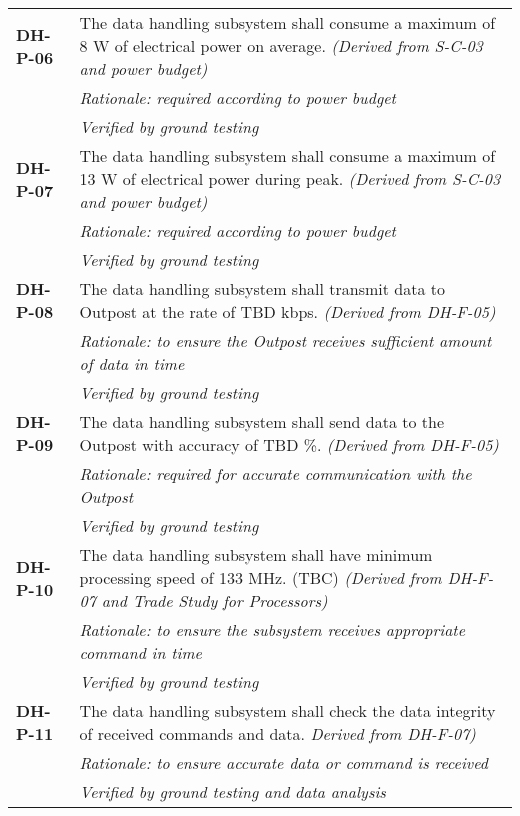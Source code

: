 \begin{longtable}{P{2cm}P{13.25cm}}
\textbf{DH-P-06}	& The data handling subsystem shall consume a maximum of 8 \gls{W} of electrical power on average. \textit{(Derived from S-C-03 and power budget)}	\\
& \textit{Rationale: required according to power budget} \\
& \textit{Verified by ground testing}	\\

\textbf{DH-P-07}	& The data handling subsystem shall consume a maximum of 13 \gls{W} of electrical power during peak. \textit{(Derived from S-C-03 and power budget)}	\\
& \textit{Rationale: required according to power budget} \\
&  \textit{Verified by ground testing}	\\

\textbf{DH-P-08}	& The data handling subsystem shall transmit data to Outpost at the rate of \gls{TBD} \gls{kbps}.
\textit{(Derived from DH-F-05)} \\
 & \textit{Rationale: to ensure the Outpost receives sufficient amount of data in time} \\
  & \textit{Verified by ground testing}				\\

\textbf{DH-P-09}	& The data handling subsystem shall send data to the Outpost with accuracy of \gls{TBD} \%. 
\textit{(Derived from DH-F-05)} \\
& \textit{Rationale: required for accurate communication with the Outpost} \\
& \textit{Verified by ground testing}	\\

\textbf{DH-P-10}	& The data handling subsystem shall have minimum processing speed of 133 \gls{MHz}. (\gls{TBC})
\textit{(Derived from DH-F-07 and Trade Study for Processors)} \\
 & \textit{Rationale: to ensure the subsystem receives appropriate command in time} \\
  & \textit{Verified by ground testing}		\\

\textbf{DH-P-11}	& The data handling subsystem shall check the data integrity of received commands and data.
\textit{Derived from DH-F-07)} \\
 & \textit{Rationale: to ensure accurate data or command is received} \\
  & \textit{Verified by ground testing and data analysis}	\\


\end{longtable}
